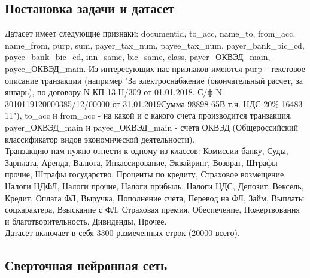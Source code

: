 \documentclass{article}
\newcommand\tab[1][1cm]{\hspace*{#1}}
\begin{document}
\subsection{Постановка задачи и датасет}
\tab Датасет имеет следующие признаки: documentid, to\_acc, name\_to, from\_acc, name\_from, purp, sum, payer\_tax\_num, payee\_tax\_num, payer\_bank\_bic\_cd, payee\_bank\_bic\_cd, inn\_same, bic\_same, class, payer\_ОКВЭД\_main, payee\_ОКВЭД\_main. Из интересующих нас признаков имеются  purp - текстовое описание транзакции (например "За электроснабжение (окончательный расчет, за январь), по договору N КП-13-Н/309 от 01.01.2018. С/ф N 3010119120000385/12/00000 от 31.01.2019Сумма 98898-65В т.ч. НДС 20\% 16483-11"), to\_acc и from\_acc - на какой и с какого счета производится транзакция, payer\_ОКВЭД\_main и payee\_ОКВЭД\_main - счета ОКВЭД (Общероссийский классификатор видов экономической деятельности).\\
\tab Транзакцию нам нужно отнести к одному из классов: Комиссии банку, Суды, Зарплата, Аренда, Валюта, Инкассирование, Эквайринг, Возврат, Штрафы прочие, Штрафы государство, Проценты по кредиту, Страховое возмещение, Налоги НДФЛ, Налоги прочие, Налоги прибыль, Налоги НДС, Депозит, Вексель, Кредит, Оплата ФЛ, Выручка, Пополнение счета, Перевод на ФЛ, Займ, Выплаты соцхарактера, Взыскание с ФЛ, Страховая премия, Обеспечение, Пожертвования и благотворительность, Дивиденды, Прочее.\\
\tab Датасет включает в себя 3300 размеченных строк (20000 всего).\\
\subsection{Сверточная нейронная сеть}
\end{document}
